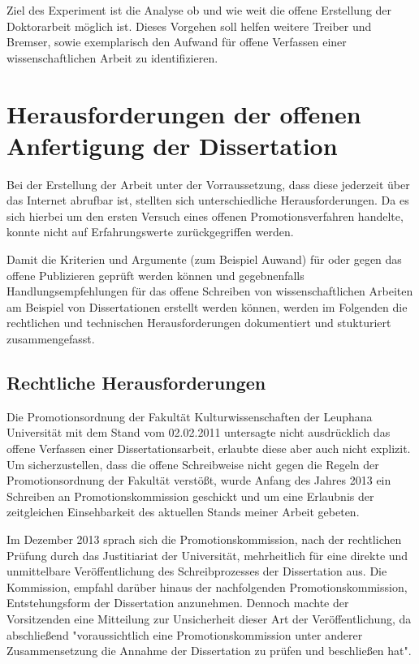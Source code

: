 Ziel des Experiment ist die Analyse ob und wie weit die offene Erstellung der Doktorarbeit möglich ist. Dieses Vorgehen soll helfen weitere Treiber und Bremser, sowie exemplarisch den Aufwand für offene Verfassen einer wissenschaftlichen Arbeit zu identifizieren.

\section{Herausforderungen der offenen Anfertigung der Dissertation}

Bei der Erstellung der Arbeit unter der Vorraussetzung, dass diese jederzeit über das Internet abrufbar ist, stellten sich unterschiedliche Herausforderungen. Da es sich hierbei um den ersten Versuch eines offenen Promotionsverfahren handelte, konnte nicht auf Erfahrungswerte zurückgegriffen werden.

Damit die Kriterien und Argumente (zum Beispiel Auwand) für oder gegen das offene Publizieren geprüft werden können und gegebnenfalls Handlungsempfehlungen für das offene Schreiben von wissenschaftlichen Arbeiten am Beispiel von Dissertationen erstellt werden können, werden im Folgenden die rechtlichen und technischen Herausforderungen dokumentiert und stukturiert zusammengefasst.

\subsection{Rechtliche Herausforderungen}

Die Promotionsordnung der Fakultät Kulturwissenschaften der Leuphana Universität mit dem Stand vom 02.02.2011 untersagte nicht ausdrücklich das offene Verfassen einer Dissertationsarbeit, erlaubte diese aber auch nicht explizit. Um sicherzustellen, dass die offene Schreibweise nicht gegen die Regeln der Promotionsordnung der Fakultät verstößt, wurde Anfang des Jahres 2013 ein Schreiben an Promotionskommission geschickt und um eine Erlaubnis der zeitgleichen Einsehbarkeit des aktuellen Stands meiner Arbeit gebeten.

Im Dezember 2013 sprach sich die Promotionskommission, nach der rechtlichen Prüfung durch das Justitiariat der Universität, mehrheitlich für eine direkte und unmittelbare Veröffentlichung des Schreibprozesses der Dissertation aus. Die Kommission, empfahl darüber hinaus der nachfolgenden Promotionskommission, Entstehungsform der Dissertation anzunehmen. Dennoch machte der Vorsitzenden eine Mitteilung zur Unsicherheit dieser Art der Veröffentlichung, da abschließend "voraussichtlich eine Promotionskommission unter anderer Zusammensetzung die Annahme der Dissertation zu prüfen und beschließen hat".

